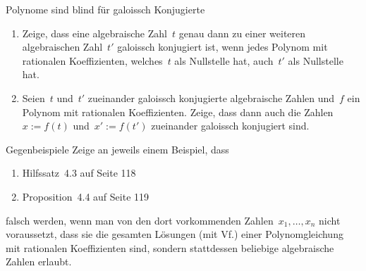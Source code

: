 \documentclass{algblatt}
\begin{document}
\begin{aufgabe}{Polynome sind blind für galoissch Konjugierte}
\begin{enumerate}
\item Zeige, dass eine algebraische Zahl~$t$ genau dann zu einer weiteren
algebraischen Zahl~$t'$ galoissch konjugiert ist, wenn jedes Polynom mit
rationalen Koeffizienten, welches~$t$ als Nullstelle hat, auch~$t'$ als
Nullstelle hat.
\item Seien~$t$ und~$t'$ zueinander galoissch konjugierte algebraische Zahlen
und~$f$ ein Polynom mit rationalen Koeffizienten. Zeige, dass dann auch die
Zahlen~$x := f(t)$ und~$x' := f(t')$ zueinander galoissch konjugiert sind.
\end{enumerate}
\end{aufgabe}

\begin{aufgabe}{Gegenbeispiele}
Zeige an jeweils einem Beispiel, dass
\begin{enumerate}
\item Hilfssatz~4.3 auf Seite 118
\item Proposition~4.4 auf Seite 119
\end{enumerate}
falsch werden, wenn man von den dort vorkommenden Zahlen~$x_1,\ldots,x_n$ nicht
voraussetzt, dass sie die gesamten Lösungen (mit Vf.) einer Polynomgleichung
mit rationalen Koeffizienten sind, sondern stattdessen beliebige algebraische
Zahlen erlaubt.
\end{aufgabe}
\end{document}
